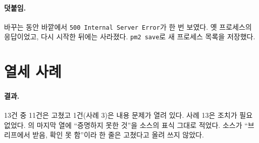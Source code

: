 \paragraph{덧붙임.}
바꾸는 동안 바깥에서 \texttt{500 Internal Server Error}가 한 번 보였다.
옛 프로세스의 응답이었고, 다시 시작한 뒤에는 사라졌다.
\texttt{pm2 save}로 새 프로세스 목록을 저장했다.

\section{열세 사례}\label{sec:dbg-cases}

\paragraph{결과.}
13건 중 11건은 고쳤고 1건(사례 3)은 내용 문제가 열려 있다.
사례 13은 조치가 필요 없었다.
의 마지막 열에 ``증명하지 못한 것''을 소스의 표식 그대로 적었다.
소스가 ``브리프에서 받음, 확인 못 함''이라 한 줄은 고쳤다고 올려 쓰지 않았다.

